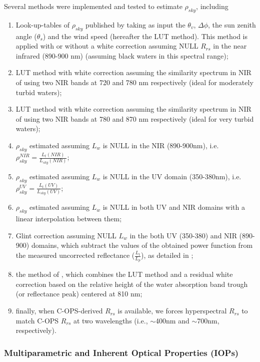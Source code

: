 \documentclass[essd, manuscript]{copernicus}
\begin{document}
Several methods were implemented and tested to estimate $\rho_{sky}$, including 
\begin{enumerate}
    \item Look-up-tables of $\rho_{sky}$ published by  \citet{Mobley1999,Mobley2015} taking as input the $\theta_v$, $\Delta\phi$, the sun zenith angle ($\theta_s$) and the wind speed (hereafter the LUT method). This method is applied with or without a white correction assuming NULL $R_{rs}$ in the near infrared (890-900 nm) (assuming black waters in this spectral range); 
    \item LUT method with white correction assuming the similarity spectrum in NIR of \citet{Ruddick2006} using two NIR bands at 720 and 780 nm respectively (ideal for moderately turbid waters); 
    \item LUT method with white correction assuming the similarity spectrum in NIR of \citet{Ruddick2006} using two NIR bands at 780 and 870 nm respectively (ideal for very turbid waters); 
    \item $\rho_{sky}$ estimated assuming $L_w$ is NULL in the NIR (890-900nm), i.e. $\rho_{sky}^{NIR} = \frac{L_t(NIR)}{L_{sky}(NIR)}$;
    \item $\rho_{sky}$ estimated assuming $L_w$ is NULL in the UV domain (350-380nm), i.e. $\rho_{sky}^{UV} = \frac{L_t(UV)}{L_{sky}(UV)}$;
    \item $\rho_{sky}$ estimated assuming $L_w$ is NULL in both UV and NIR domains with a linear interpolation between them; 
    \item Glint correction assuming NULL $L_w$ in the both UV (350-380) and NIR (890-900) domains, which subtract the values of the obtained power function from the measured uncorrected reflectance ($\frac{L_t}{L_p}$), as detailed in \citet{Kutser2013RemovingWaters}; 
    \item the method of \citet{Jiang2020AMeasurements}, which combines the LUT method and a residual white correction based on the relative height of the water absorption band trough (or reflectance peak) centered at 810 nm;
    \item finally, when C-OPS-derived $R_{rs}$ is available, we forces hyperspectral $R_{rs}$ to match C-OPS $R_{rs}$ at two wavelengths (i.e., $\sim$400nm and $\sim$700nm, respectively). 
\end{enumerate} 




\subsubsection{Multiparametric and Inherent Optical Properties (IOPs)}
\end{document}
